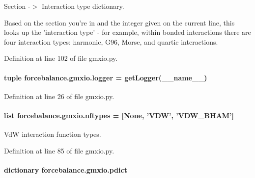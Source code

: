 Section -\/$>$ Interaction type dictionary. 

Based on the section you're in and the integer given on the current line, this looks up the 'interaction type' -\/ for example, within bonded interactions there are four interaction types\-: harmonic, G96, Morse, and quartic interactions. 

Definition at line 102 of file gmxio.\-py.

\hypertarget{namespaceforcebalance_1_1gmxio_ac10457054444ca04e0a265665afc2512}{
\paragraph[{logger}]{\setlength{\rightskip}{0pt plus 5cm}tuple forcebalance.\-gmxio.\-logger = get\-Logger(\-\_\-\-\_\-name\-\_\-\-\_\-)}}\label{namespaceforcebalance_1_1gmxio_ac10457054444ca04e0a265665afc2512}


Definition at line 26 of file gmxio.\-py.

\hypertarget{namespaceforcebalance_1_1gmxio_a337bc61280b58a43319380dec9c5529a}{
\paragraph[{nftypes}]{\setlength{\rightskip}{0pt plus 5cm}list forcebalance.\-gmxio.\-nftypes = \mbox{[}None, 'V\-D\-W', 'V\-D\-W\-\_\-\-B\-H\-A\-M'\mbox{]}}}\label{namespaceforcebalance_1_1gmxio_a337bc61280b58a43319380dec9c5529a}


Vd\-W interaction function types. 



Definition at line 85 of file gmxio.\-py.

\hypertarget{namespaceforcebalance_1_1gmxio_ae845e0b923ecde16c79f2742b94534a6}{
\paragraph[{pdict}]{\setlength{\rightskip}{0pt plus 5cm}dictionary forcebalance.\-gmxio.\-pdict}}\label{namespaceforcebalance_1_1gmxio_ae845e0b923ecde16c79f2742b94534a6}



